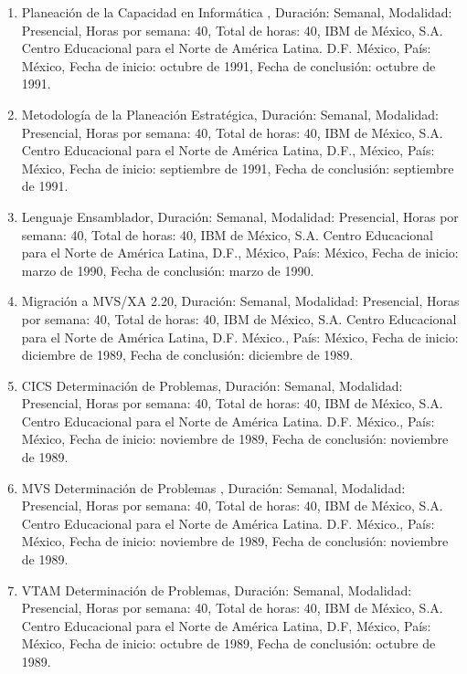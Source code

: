 \begin{enumerate}
\item Planeación de la Capacidad en Informática , Duración: Semanal, Modalidad: Presencial, Horas por semana: 40, Total de 
horas: 40, IBM de México, S.A. Centro Educacional para el Norte de América Latina. D.F. México, País: México, Fecha de 
inicio: octubre de 1991, Fecha de conclusión: octubre de 1991.

\item Metodología de la Planeación Estratégica, Duración: Semanal, Modalidad: Presencial, Horas por semana: 40, Total de 
horas: 40, IBM de México, S.A. Centro Educacional para el Norte de América Latina, D.F., México, País: México, Fecha de 
inicio: septiembre de 1991, Fecha de conclusión: septiembre de 1991.

\item Lenguaje Ensamblador, Duración: Semanal, Modalidad: Presencial, Horas por semana: 40, Total de horas: 40, IBM de 
México, S.A. Centro Educacional para el Norte de América Latina, D.F., México, País: México, Fecha de inicio: marzo de 
1990, Fecha de conclusión: marzo de 1990.

\item Migración a MVS/XA 2.20, Duración: Semanal, Modalidad: Presencial, Horas por semana: 40, Total de horas: 40, IBM de 
México, S.A. Centro Educacional para el Norte de América Latina, D.F. México., País: México, Fecha de inicio: diciembre de 
1989, Fecha de conclusión: diciembre de 1989.

\item CICS Determinación de Problemas, Duración: Semanal, Modalidad: Presencial, Horas por semana: 40, Total de horas: 40, 
IBM de México, S.A. Centro Educacional para el Norte de América Latina. D.F. México., País: México, Fecha de inicio: 
noviembre de 1989, Fecha de conclusión: noviembre de 1989.

\item MVS Determinación de Problemas , Duración: Semanal, Modalidad: Presencial, Horas por semana: 40, Total de horas: 40, 
IBM de México, S.A. Centro Educacional para el Norte de América Latina. D.F. México., País: México, Fecha de inicio: 
noviembre de 1989, Fecha de conclusión: noviembre de 1989.

\item VTAM Determinación de Problemas, Duración: Semanal, Modalidad: Presencial, Horas por semana: 40, Total de horas: 40, 
IBM de México, S.A. Centro Educacional para el Norte de América Latina, D.F, México, País: México, Fecha de inicio: octubre 
de 1989, Fecha de conclusión: octubre de 1989.


\end{enumerate}

